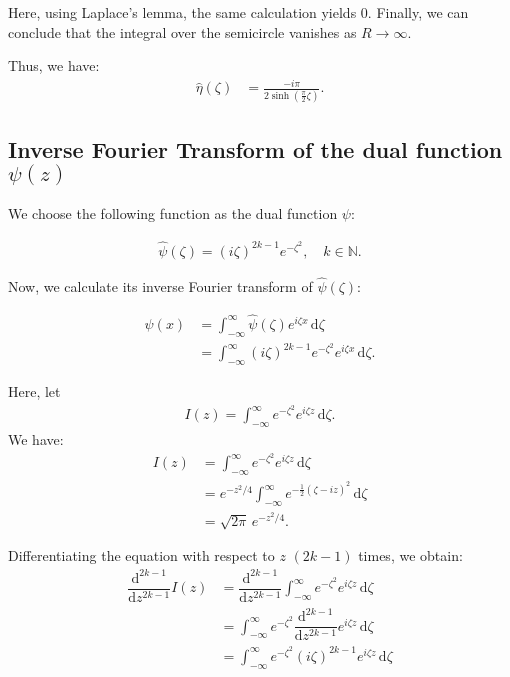 \documentclass[a4paper,12pt]{article}
\newcommand{\z}{\zeta}
\newcommand{\dd}{\mathrm{d}}
\newcommand{\diff}[2]{\dfrac{\dd #1}{\dd #2}}
\newcommand{\psihat}{\widehat{\psi}}
\newcommand{\etahat}{\widehat{\eta}}
\begin{document}
Here, using Laplace's lemma, the same calculation yields 0.
Finally, we can conclude that the integral over the semicircle vanishes as $R \to \infty$.

\bigskip

Thus, we have:
\begin{align*}
  \etahat(\z) &= \frac{-i\pi}{2\sinh\left(\frac{\pi}{2} \z\right)}.
\end{align*}

\subsection{Inverse Fourier Transform of the dual function $\psi(z)$}

We choose the following function as the dual function $\psi$:

\begin{align}
  \psihat(\z) = (i \z)^{2k-1} e^{-\z^2}, \quad k \in \mathbb{N}.
\end{align}

Now, we calculate its inverse Fourier transform of $\psihat(\z)$:

\begin{align*}
  \psi(x) &= \int_{-\infty}^{\infty} \psihat(\z) e^{i \z x} \, \dd\z \\
  &= \int_{-\infty}^{\infty} (i\z)^{2k-1} e^{-\z^2} e^{i \z x} \, \dd\z.
\end{align*}

Here, let 
\begin{align}
  I(z) = \int_{-\infty}^{\infty} e^{-\z^2} e^{i \z z} \, \dd\z.
\end{align}
 We have:
  \begin{align*}
    I(z) &= \int_{-\infty}^{\infty} e^{-\z^2} e^{i \z z} \, \dd\z \\
    &= e^{-z^2/4} \int_{-\infty}^{\infty} e^{-\frac{1}{2}(\z - iz)^2} \, \dd\z \\
    &= \sqrt{2\pi} \, e^{-z^2/4}.
  \end{align*}

  Differentiating the equation with respect to $z$ $(2k-1)$ times, we obtain:
  \begin{align*}
    \diff{^{2k-1}}{z^{2k-1}} I(z) &= \diff{^{2k-1}}{z^{2k-1}} \int_{-\infty}^{\infty} e^{-\z^2} e^{i \z z} \, \dd\z \\
    &= \int_{-\infty}^{\infty} e^{-\z^2} \diff{^{2k-1}}{z^{2k-1}} e^{i \z z} \, \dd\z \\
    &= \int_{-\infty}^{\infty} e^{-\z^2} (i \z)^{2k-1} e^{i \z z} \, \dd\z \\
  \end{align*}
\end{document}
